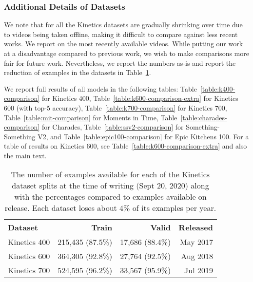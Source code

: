\documentclass[final]{cvpr}
\begin{document}
\subsubsection{Additional Details of Datasets}

We note that for all the Kinetics datasets are gradually shrinking over time due to videos being taken offline, making it difficult to compare against less recent works.
We report on the most recently available videos.
While putting our work at a disadvantage compared to previous work, we wish to make comparisons more fair for future work.
Nevertheless, we report the numbers as-is and report the reduction of examples in the datasets in Table~\ref{table:kinetics-num-examples}.

We report full results of all models in the following tables: Table~\ref{table:k400-comparison} for Kinetics 400, Table~\ref{table:k600-comparison-extra} for Kinetics 600 (with top-5 accuracy), Table~\ref{table:k700-comparison} for Kinetics 700, Table~\ref{table:mit-comparison} for Moments in Time, Table~\ref{table:charades-comparison} for Charades, Table~\ref{table:ssv2-comparison} for Something-Something V2, and Table~\ref{table:epic100-comparison} for Epic Kitchens 100.
For a table of results on Kinetics 600, see Table~\ref{table:k600-comparison-extra} and also the main text.

\begin{table}[tbp]
    \footnotesize
    \begin{center}
    \begin{tabularx}{\columnwidth}{@{}Xrrr@{}}
    \toprule
        \sc Dataset & \sc Train & \sc Valid & \sc Released \\
    \midrule
        Kinetics 400 & 215,435 (87.5\%) & 17,686 (88.4\%) & May 2017 \\
        Kinetics 600 & 364,305 (92.8\%) & 27,764 (92.5\%) & Aug 2018 \\
        Kinetics 700 & 524,595 (96.2\%) & 33,567 (95.9\%) & Jul 2019 \\
\bottomrule
    \end{tabularx}
    \end{center}
    \caption{
        The number of examples available for each of the Kinetics dataset splits at the time of writing (Sept 20, 2020) along with the percentages compared to examples available on release.
        Each dataset loses about 4\% of its examples per year.
    }
    \label{table:kinetics-num-examples}
\end{table}
\end{document}
